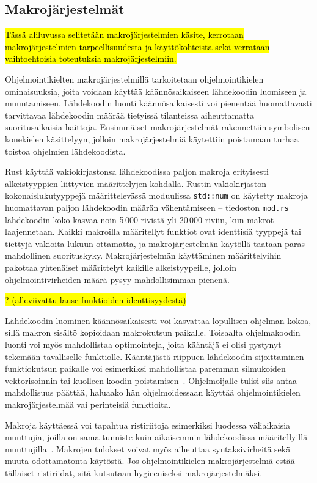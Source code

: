 \subsection{Makrojärjestelmät}

\hl{Tässä aliluvussa selitetään makrojärjestelmien käsite, kerrotaan
makrojärjestelmien tarpeellisuudesta ja käyttökohteista sekä verrataan
vaihtoehtoisia toteutuksia makrojärjestelmiin.}

Ohjelmointikielten makrojärjestelmillä tarkoitetaan ohjelmointikielen
ominaisuuksia, joita voidaan käyttää käännösaikaiseen lähdekoodin luomiseen ja
muuntamiseen. Lähdekoodin luonti käännösaikaisesti voi pienentää huomattavasti
tarvittavaa lähdekoodin määrää tietyissä tilanteissa aiheuttamatta
suoritusaikaisia haittoja. Ensimmäiset makrojärjestelmät rakennettiin
symbolisen konekielen käsittelyyn, jolloin makrojärjestelmiä käytettiin
poistamaan turhaa toistoa ohjelmien lähdekoodista.

Rust käyttää vakiokirjastonsa lähdekoodissa paljon makroja erityisesti
alkeistyyppien liittyvien määrittelyjen kohdalla. Rustin vakiokirjaston
kokonaislukutyyppejä määrittelevässä moduulissa \texttt{std::num} on käytetty
makroja huomattavan paljon lähdekoodin määrän vähentämiseen -- tiedoston
\texttt{mod.rs} lähdekoodin koko kasvaa noin 5\,000 rivistä yli 20\,000 riviin,
kun makrot laajennetaan. Kaikki makroilla määritellyt funktiot ovat identtisiä
tyyppejä tai tiettyjä vakioita lukuun ottamatta, ja makrojärjestelmän käytöllä
taataan paras mahdollinen suorituskyky. Makrojärjestelmän käyttäminen
määrittelyihin pakottaa yhtenäiset määrittelyt kaikille alkeistyypeille,
jolloin ohjelmointivirheiden määrä pysyy mahdollisimman pienenä.

\hl{? (alleviivattu lause funktioiden identtisyydestä)}

Lähdekoodin luominen käännösaikaisesti voi kasvattaa lopullisen ohjelman kokoa,
sillä makron sisältö kopioidaan makrokutsun paikalle. Toisaalta ohjelmakoodin
luonti voi myös mahdollistaa optimointeja, joita kääntäjä ei olisi pystynyt
tekemään tavalliselle funktiolle. Kääntäjästä riippuen lähdekoodin
sijoittaminen funktiokutsun paikalle voi esimerkiksi mahdollistaa paremman
silmukoiden vektorisoinnin tai kuolleen koodin poistamisen~\citep{cinlining}.
Ohjelmoijalle tulisi siis antaa mahdollisuus päättää, haluaako hän
ohjelmoidessaan käyttää ohjelmointikielen makrojärjestelmää vai perinteisiä
funktioita.

Makroja käyttäessä voi tapahtua ristiriitoja esimerkiksi luodessa väliaikaisia
muuttujia, joilla on sama tunniste kuin aikaisemmin lähdekoodissa
määritellyillä muuttujilla~\citep{macrohygiene}. Makrojen tulokset voivat myös
aiheuttaa syntaksivirheitä sekä muuta odottamatonta käytöstä. Jos
ohjelmointikielen makrojärjestelmä estää tällaiset ristiriidat, sitä kutsutaan
hygieeniseksi makrojärjestelmäksi.

